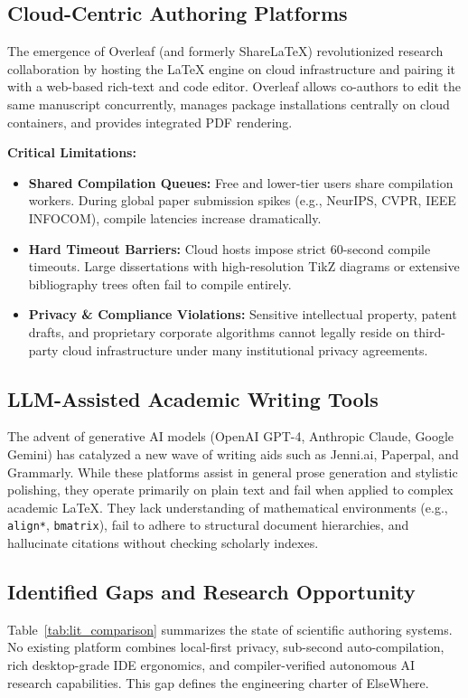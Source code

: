 \documentclass[12pt,a4paper]{article}
\newcommand{\code}[1]{\texttt{#1}}
\begin{document}
\subsection{Cloud-Centric Authoring Platforms}
The emergence of Overleaf (and formerly Share\LaTeX{}) revolutionized research collaboration by hosting the \LaTeX{} engine on cloud infrastructure and pairing it with a web-based rich-text and code editor. Overleaf allows co-authors to edit the same manuscript concurrently, manages package installations centrally on cloud containers, and provides integrated PDF rendering.

\textbf{Critical Limitations:}
\begin{itemize}
    \item \textbf{Shared Compilation Queues:} Free and lower-tier users share compilation workers. During global paper submission spikes (e.g., NeurIPS, CVPR, IEEE INFOCOM), compile latencies increase dramatically.
    \item \textbf{Hard Timeout Barriers:} Cloud hosts impose strict 60-second compile timeouts. Large dissertations with high-resolution TikZ diagrams or extensive bibliography trees often fail to compile entirely.
    \item \textbf{Privacy \& Compliance Violations:} Sensitive intellectual property, patent drafts, and proprietary corporate algorithms cannot legally reside on third-party cloud infrastructure under many institutional privacy agreements.
\end{itemize}

\subsection{LLM-Assisted Academic Writing Tools}
The advent of generative AI models (OpenAI GPT-4, Anthropic Claude, Google Gemini) has catalyzed a new wave of writing aids such as Jenni.ai, Paperpal, and Grammarly. While these platforms assist in general prose generation and stylistic polishing, they operate primarily on plain text and fail when applied to complex academic \LaTeX{}. They lack understanding of mathematical environments (e.g., \code{align*}, \code{bmatrix}), fail to adhere to structural document hierarchies, and hallucinate citations without checking scholarly indexes.

\subsection{Identified Gaps and Research Opportunity}
Table~\ref{tab:lit_comparison} summarizes the state of scientific authoring systems. No existing platform combines local-first privacy, sub-second auto-compilation, rich desktop-grade IDE ergonomics, and compiler-verified autonomous AI research capabilities. This gap defines the engineering charter of ElseWhere.
\end{document}
